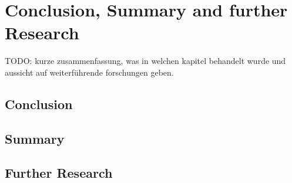 \documentclass[Bachelorarbeit.tex]{subfiles}
\begin{document}
\chapter{Conclusion, Summary and further Research}
TODO: kurze zusammenfassung, was in welchen kapitel behandelt wurde und aussicht auf weiterführende forschungen geben.

\section{Conclusion}

\section{Summary}

\section{Further Research}
\end{document}
